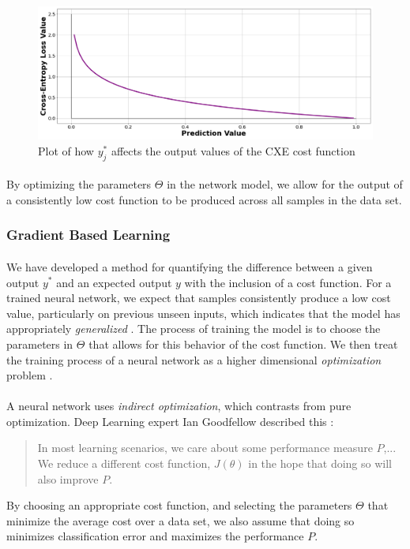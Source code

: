 \documentclass[12pt,letterpaper]{article}
\begin{document}
\begin{figure}[h]
\begin{center}
\includegraphics[scale=0.25]{../Figures/CXELoss}
\end{center}
\caption{Plot of how $y^*_{j}$ affects the output values of the CXE cost function}
\label{fig-CXELoss}
\end{figure}

\paragraph*{}By optimizing the parameters $\Theta$ in the network model, we allow for the output of a consistently low cost function to be produced across all samples in the data set.


\subsubsection{Gradient Based Learning}

\paragraph*{}We have developed a method for quantifying the difference between a given output $y^*$ and an expected output $y$ with the inclusion of a cost function. For a trained neural network, we expect that samples consistently produce a low cost value, particularly on previous unseen inputs, which indicates that the model has appropriately \textit{generalized} \cite{James,Loy}. The process of training the model is to choose the parameters in $\Theta$ that allows for this behavior of the cost function. We then treat the training process of a neural network as a higher dimensional \textit{optimization} problem \cite{Goodfellow}.

\paragraph*{}A neural network uses \textit{indirect optimization}, which contrasts from pure optimization. Deep Learning expert Ian Goodfellow described this \cite{Goodfellow}:
\begin{quote}
In most learning scenarios, we care about some performance measure $P$,... We reduce a different cost function, $J(\theta)$ in the hope that doing so will also improve $P$.
\end{quote}
By choosing an appropriate cost function, and selecting the parameters $\Theta$ that minimize the average cost over a data set, we also assume that doing so minimizes classification error and maximizes the performance $P$.
\end{document}
